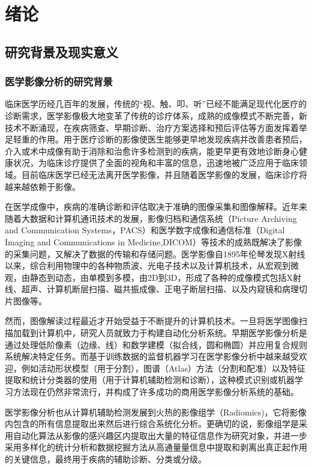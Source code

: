 \chapter{绪论}
\label{chap:introduction}

\section{研究背景及现实意义}
\subsection{医学影像分析的研究背景}

临床医学历经几百年的发展，传统的“视、触、叩、听”已经不能满足现代化医疗的诊断需求，医学影像极大地变革了传统的诊疗体系，成熟的成像模式不断完善，新技术不断涌现，在疾病筛查、早期诊断、治疗方案选择和预后评估等方面发挥着举足轻重的作用。用于医疗诊断的影像使医生能够更早地发现疾病并改善患者预后，介入或术中成像有助于消除和治愈许多检测到的疾病，能更早更有效地诊断身心健康状况，为临床诊疗提供了全面的视角和丰富的信息，迅速地被广泛应用于临床领域。目前临床医学已经无法离开医学影像，并且随着医学影像的发展，临床诊疗将越来越依赖于影像。

在医学成像中，疾病的准确诊断和评估取决于准确的图像采集和图像解释。近年来随着大数据和计算机通讯技术的发展，影像归档和通信系统（Picture Archiving and Communication Systems，PACS）和医学数字成像和通信标准（Digital Imaging and Communications in Medicine,DICOM）等技术的成熟既解决了影像的采集问题，又解决了数据的传输和存储问题。医学影像自1895年伦琴发现X射线以来，综合利用物理中的各种物质波、光电子技术以及计算机技术，从宏观到微观，由静态到动态，由单模到多模，由2D到3D，形成了各种的成像模式包括X射线、超声、计算机断层扫描、磁共振成像、正电子断层扫描、以及内窥镜和病理切片图像等。

然而，图像解读过程最近才开始受益于不断提升的计算机技术。一旦将医学图像扫描加载到计算机中，研究人员就致力于构建自动化分析系统。早期医学影像分析是通过处理低阶像素（边缘、线）和数学建模（拟合线，圆和椭圆）并应用复合规则系统解决特定任务。而基于训练数据的监督机器学习在医学影像分析中越来越受欢迎，例如活动形状模型（用于分割），图谱（Atlas）方法（分割和配准）以及特征提取和统计分类器的使用（用于计算机辅助检测和诊断），这种模式识别或机器学习方法现在仍然非常流行，并构成了许多成功的商用医学影像分析系统的基础。

医学影像分析也从计算机辅助检测发展到火热的影像组学（Radiomics)\citep{Lambin2015}，它将影像内包含的所有信息提取出来然后进行综合系统化分析。更确切的说，影像组学是采用自动化算法从影像的感兴趣区内提取出大量的特征信息作为研究对象，并进一步采用多样化的统计分析和数据挖掘方法从高通量量信息中提取和剥离出真正起作用的关键信息，最终用于疾病的辅助诊断、分类或分级。

